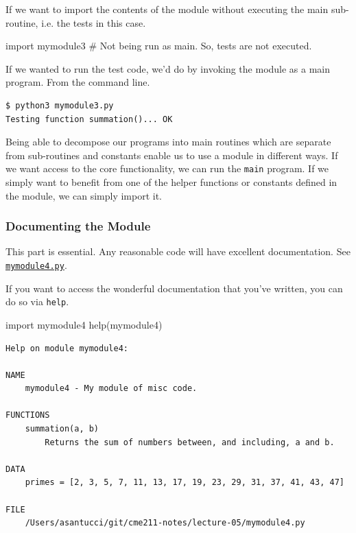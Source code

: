 \documentclass[12pt,letterpaper,twoside]{article}
\begin{document}
If we want to import the contents of the module without executing the main sub-routine, i.e.
the tests in this case.

\begin{python}
import mymodule3    # Not being run as main. So, tests are not executed.
\end{python}

If we wanted to run the test code, we'd do by invoking the module as a main program.
From the command line.

\begin{verbatim}
$ python3 mymodule3.py
Testing function summation()... OK
\end{verbatim}

Being able to decompose our programs into main routines which are separate from sub-routines
and constants enable us to use a module in different ways. If we want access to the core 
functionality, we can run the \texttt{main} program. If we simply want to benefit from
one of the helper functions or constants defined in the module, we can simply
import it.

\subsubsection{Documenting the Module}
This part is essential. Any reasonable code will have excellent documentation.
See 
\href{https://github.com/CME211/notes/blob/fall_18/lecture-05/mymodule4.py}{\texttt{mymodule4.py}}.



If you want to access the wonderful documentation that you've written, you can do so via 
\texttt{help}.

\begin{python}
import mymodule4
help(mymodule4)
\end{python}

{
\small
\begin{verbatim}
Help on module mymodule4:

NAME
    mymodule4 - My module of misc code.

FUNCTIONS
    summation(a, b)
        Returns the sum of numbers between, and including, a and b.

DATA
    primes = [2, 3, 5, 7, 11, 13, 17, 19, 23, 29, 31, 37, 41, 43, 47]

FILE
    /Users/asantucci/git/cme211-notes/lecture-05/mymodule4.py
\end{verbatim}
}
\end{document}
